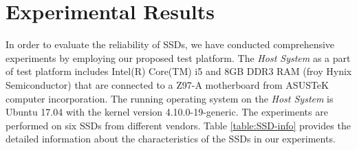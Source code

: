 \vspace{-1em}
\section{Experimental Results}
\vspace{-0.6em}
\label{SEC:EXPR}
In order to evaluate the reliability of SSDs, we have conducted comprehensive experiments by employing our proposed test platform. The \emph{Host System} as a part of test platform includes Intel(R) Core(TM) i5 and 8GB DDR3 RAM (froy Hynix Semiconductor) that are connected to a Z97-A motherboard from ASUSTeK computer incorporation. The running operating system on the \emph{Host System} is Ubuntu 17.04 with the kernel version 4.10.0-19-generic.
 The experiments are performed on six SSDs from different vendors. Table \ref{table:SSD-info} provides the detailed information about the characteristics of the SSDs in our experiments.
 
